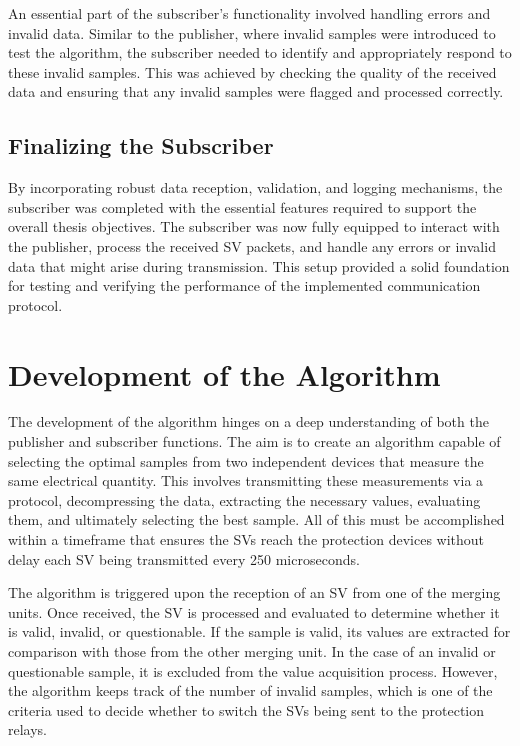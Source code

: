 	An essential part of the subscriber’s functionality involved handling errors and invalid data. Similar to the publisher, where invalid samples were introduced to test the algorithm, the subscriber needed to identify and appropriately respond to these invalid samples. This was achieved by checking the quality of the received data and ensuring that any invalid samples were flagged and processed correctly.
	
	\subsection{Finalizing the Subscriber}
	
	By incorporating robust data reception, validation, and logging mechanisms, the subscriber was completed with the essential features required to support the overall thesis objectives. The subscriber was now fully equipped to interact with the publisher, process the received SV packets, and handle any errors or invalid data that might arise during transmission. This setup provided a solid foundation for testing and verifying the performance of the implemented communication protocol.
	
	
	\section{Development of the Algorithm}
	
	The development of the algorithm hinges on a deep understanding of both the publisher and subscriber functions. The aim is to create an algorithm capable of selecting the optimal samples from two independent devices that measure the same electrical quantity. This involves transmitting these measurements via a protocol, decompressing the data, extracting the necessary values, evaluating them, and ultimately selecting the best sample. All of this must be accomplished within a timeframe that ensures the SVs reach the protection devices without delay each SV being transmitted every 250 microseconds.
	
	The algorithm is triggered upon the reception of an SV from one of the merging units. Once received, the SV is processed and evaluated to determine whether it is valid, invalid, or questionable. If the sample is valid, its values are extracted for comparison with those from the other merging unit. In the case of an invalid or questionable sample, it is excluded from the value acquisition process. However, the algorithm keeps track of the number of invalid samples, which is one of the criteria used to decide whether to switch the SVs being sent to the protection relays.
	
